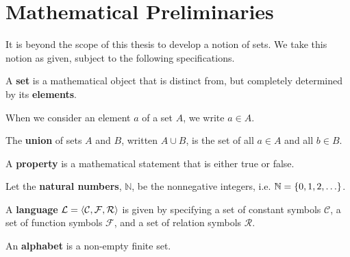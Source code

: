 \section{Mathematical Preliminaries}

\label{sec:preface:mathematical-preliminaries}

It is beyond the scope of this thesis to develop a notion of sets. We take this
notion as given, subject to the following specifications.

\begin{specification} A \textbf{set} is a mathematical object that is distinct
from, but completely determined by its \textbf{elements}. \end{specification}

\begin{notation} When we consider an element $a$ of a set $A$, we write $a\in
A$. \end{notation}

\begin{definition} The \textbf{union} of sets $A$ and $B$, written $A\cup B$,
is the set of all $a\in A$ and all $b\in B$. \end{definition}

\begin{specification} A \textbf{property} is a mathematical statement that is
either true or false. \end{specification}

\begin{notion}

Let the \textbf{natural numbers}, $\mathbb{N}$, be the nonnegative integers,
i.e.  $\mathbb{N}=\mathopen{}\left\{{0,1,2,\ldots}\right\}\mathclose{}$.

\end{notion}

\begin{definition}

A \textbf{language} $\mathcal{L}=\mathopen{}\left\langle{\mathcal{C},\mathcal{F}, \mathcal{R}}\right\rangle\mathclose{}$
is given by specifying a set of constant symbols $\mathcal{C}$, a set of
function symbols $\mathcal{F}$, and a set of relation symbols $\mathcal{R}$.

\end{definition}


\begin{definition}

An \textbf{alphabet} is a non-empty finite set.

\end{definition}

